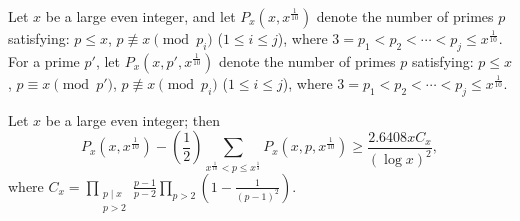 Let $x$ be a large even integer, and let $P_x(x,x^{\frac1{10}})$ denote the number of primes $p$ satisfying: $p\leqslant x$, $p\not\equiv x\pmod{p_i}$ ($1\leqslant i\leqslant j$), where $3=p_1<p_2<\cdots<p_j\leqslant x^{\frac1{10}}$. For a prime $p'$, let $P_x(x,p',x^{\frac1{10}})$ denote the number of primes $p$ satisfying: $p\leqslant x$, $p\equiv x\pmod{p'}$, $p\not\equiv x\pmod{p_i}$ ($1\leqslant i\leqslant j$), where $3=p_1<p_2<\cdots<p_j\leqslant x^{\frac1{10}}$.

\begin{lemma}
Let $x$ be a large even integer; then
\[
P_x(x,x^{\frac1{10}})-\left(\frac12\right)\sum_{x^{\frac1{10}}<p\leqslant x^{\frac13}}P_x(x,p,x^{\frac1{10}})\geqslant\frac{2.6408xC_x}{(\log x)^2},
\]
where $C_x=\displaystyle\prod_{\substack{p\mid x\\p>2}}\frac{p-1}{p-2}\prod_{p>2}\left(1-\frac1{(p-1)^2}\right)$.
\end{lemma}

